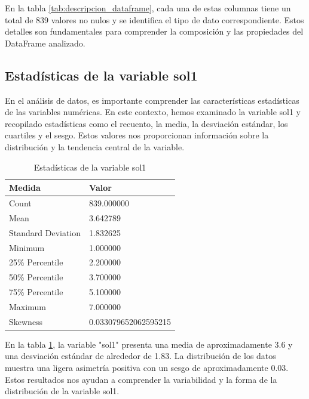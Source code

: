 En la tabla \ref{tab:descripcion_dataframe}, cada una de estas columnas tiene un total de 839 valores no nulos y se identifica el tipo de dato correspondiente. Estos detalles son fundamentales para comprender la composición y las propiedades del DataFrame analizado.

\subsection{Estadísticas de la variable sol1}

En el análisis de datos, es importante comprender las características estadísticas de las variables numéricas. En este contexto, hemos examinado la variable sol1 y recopilado estadísticas como el recuento, la media, la desviación estándar, los cuartiles y el sesgo. Estos valores nos proporcionan información sobre la distribución y la tendencia central de la variable.

\begin{table}[H]
    \centering
    \caption{Estadísticas de la variable sol1}
    \begin{tabular}{ll}
        \hline
        \textbf{Medida}    & \textbf{Valor}       \\
        \hline
        Count              & 839.000000           \\
        Mean               & 3.642789             \\
        Standard Deviation & 1.832625             \\
        Minimum            & 1.000000             \\
        25\% Percentile    & 2.200000             \\
        50\% Percentile    & 3.700000             \\
        75\% Percentile    & 5.100000             \\
        Maximum            & 7.000000             \\
        Skewness           & 0.033079652062595215 \\
        \hline
    \end{tabular}%
    \label{tab:estadistica_variable_sol1}%
\end{table}%

En la tabla \ref{tab:estadistica_variable_sol1}, la variable "sol1" presenta una media de aproximadamente 3.6 y una desviación estándar de alrededor de 1.83. La distribución de los datos muestra una ligera asimetría positiva con un sesgo de aproximadamente 0.03. Estos resultados nos ayudan a comprender la variabilidad y la forma de la distribución de la variable sol1.

